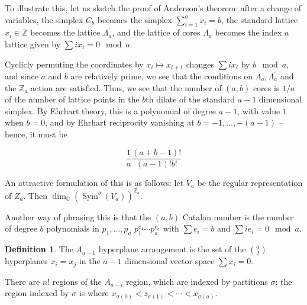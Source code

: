 \documentclass{amsart}[12pt]
\theoremstyle{definition}
\newtheorem{definition}[dummy]{Definition}
\newcommand{\Z}{\mathbb{Z}}
\newcommand{\C}{\mathbb{C}}
\DeclareMathOperator{\Sym}{Sym}
\begin{document}




To illustrate this, let us sketch the proof of Anderson's theorem:
after a change of variables, the simplex $C_b$ becomes the simplex
$\sum_{i=1}^a x_i=b$, the standard lattice $x_i\in\Z$ becomes the
lattice $\Lambda^\prime_a$, and the lattice of cores $\Lambda_a$ becomes the index $a$ lattice given by $\sum ix_i=0\mod a$.

Cyclicly permuting the coordinates by $x_i\mapsto x_{i+1}$ changes
$\sum ix_i$ by $b\mod a$, and since $a$ and $b$ are relatively prime,
we see that the conditions on $\Lambda_a, \Lambda^\prime_a$ and the
$\Z_a$ action are satisfied.  Thus, we see that the number of $(a,b)$
cores is $1/a$ of the number of lattice points in the $b$th dilate of
the standard $a-1$ dimensional simplex.  By Ehrhart theory, this is a
polynomial of degree $a-1$, with value $1$ when $b=0$, and by Ehrhart
reciprocity vanishing at $b=-1,\dots, -(a-1)$ -- hence, it must be

$$\frac{1}{a}\frac{(a+b-1)!}{(a-1)!b!}$$

An attractive formulation of this is as follows: let $V_a$ be the
regular representation of $Z_a$.  Then $\dim_\C \left(\Sym^b(V_a)\right)^{\Z_a}.$

Another way of phrasing this is that the $(a,b)$ Catalan number is the number of degree $b$ polynomials in $p_1,\dots, p_a$ $p_1^{e_1}\cdots p_a^{e_a}$ with $\sum e_i=b$ and $\sum i e_i=0\mod a$.



\begin{definition}
The $A_{a-1}$ hyperplane arrangement is the set of the $\binom{a}{2}$ hyperplanes $x_i=x_j$ in the $a-1$ dimensional vector space $\sum x_i=0$.

There are $n!$ regions of the $A_{a-i}$ region, which are indexed by partitions $\sigma$; the region indexed by $\sigma$ is where $x_{\sigma(0)}<z_{\sigma(1)}<\cdots<x_{\sigma(a)}$.
\end{definition}
\end{document}

